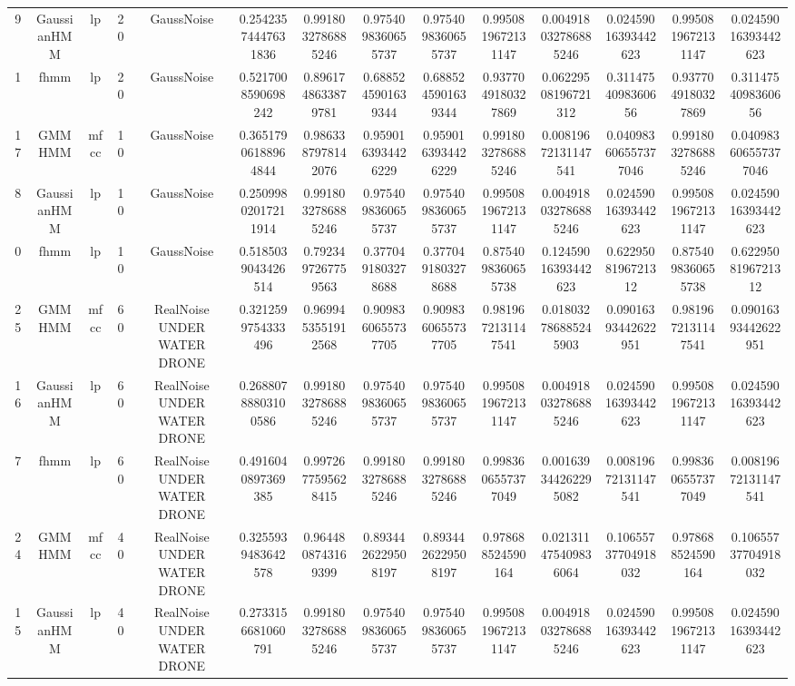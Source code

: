 \begin{table}[htb]
\begin{tabular}{@{}cccccccccccccc@{}}
        9 & GaussianHMM & lp & 20 & GaussNoise & 0.25423574447631836 & 0.9918032786885246 & 0.9754098360655737 & 0.9754098360655737 & 0.9950819672131147 & 0.004918032786885246 & 0.02459016393442623 & 0.9950819672131147 & 0.02459016393442623 \\
        1 & fhmm & lp & 20 & GaussNoise & 0.5217008590698242 & 0.8961748633879781 & 0.6885245901639344 & 0.6885245901639344 & 0.9377049180327869 & 0.06229508196721312 & 0.3114754098360656 & 0.9377049180327869 & 0.3114754098360656 \\
        17 & GMMHMM & mfcc & 10 & GaussNoise & 0.36517906188964844 & 0.9863387978142076 & 0.9590163934426229 & 0.9590163934426229 & 0.9918032786885246 & 0.00819672131147541 & 0.040983606557377046 & 0.9918032786885246 & 0.040983606557377046 \\
        8 & GaussianHMM & lp & 10 & GaussNoise & 0.25099802017211914 & 0.9918032786885246 & 0.9754098360655737 & 0.9754098360655737 & 0.9950819672131147 & 0.004918032786885246 & 0.02459016393442623 & 0.9950819672131147 & 0.02459016393442623 \\
        0 & fhmm & lp & 10 & GaussNoise & 0.5185039043426514 & 0.7923497267759563 & 0.3770491803278688 & 0.3770491803278688 & 0.8754098360655738 & 0.12459016393442623 & 0.6229508196721312 & 0.8754098360655738 & 0.6229508196721312 \\
        25 & GMMHMM & mfcc & 60 & RealNoise UNDER WATER DRONE & 0.3212599754333496 & 0.9699453551912568 & 0.9098360655737705 & 0.9098360655737705 & 0.9819672131147541 & 0.018032786885245903 & 0.09016393442622951 & 0.9819672131147541 & 0.09016393442622951 \\
        16 & GaussianHMM & lp & 60 & RealNoise UNDER WATER DRONE & 0.26880788803100586 & 0.9918032786885246 & 0.9754098360655737 & 0.9754098360655737 & 0.9950819672131147 & 0.004918032786885246 & 0.02459016393442623 & 0.9950819672131147 & 0.02459016393442623 \\
        7 & fhmm & lp & 60 & RealNoise UNDER WATER DRONE & 0.4916040897369385 & 0.9972677595628415 & 0.9918032786885246 & 0.9918032786885246 & 0.9983606557377049 & 0.001639344262295082 & 0.00819672131147541 & 0.9983606557377049 & 0.00819672131147541 \\
        24 & GMMHMM & mfcc & 40 & RealNoise UNDER WATER DRONE & 0.3255939483642578 & 0.9644808743169399 & 0.8934426229508197 & 0.8934426229508197 & 0.978688524590164 & 0.021311475409836064 & 0.10655737704918032 & 0.978688524590164 & 0.10655737704918032 \\
        15 & GaussianHMM & lp & 40 & RealNoise UNDER WATER DRONE & 0.2733156681060791 & 0.9918032786885246 & 0.9754098360655737 & 0.9754098360655737 & 0.9950819672131147 & 0.004918032786885246 & 0.02459016393442623 & 0.9950819672131147 & 0.02459016393442623 \\

\end{tabular}
\end{table}
